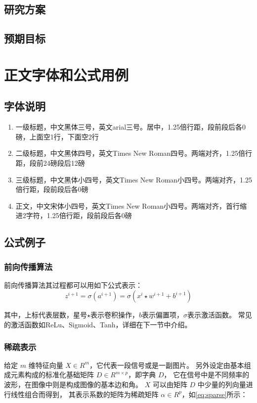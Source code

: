 \documentclass[12pt]{zjutbook}
\begin{document}
\section{研究方案}
\section{预期目标}

\chapter{正文字体和公式用例}
\section{字体说明}
\begin{enumerate}
  \item 一级标题，中文黑体三号，英文arial三号。居中，1.25倍行距，段前段后各0磅，上面空1行，下面空2行
  \item 二级标题，中文黑体四号，英文Times New Roman四号。两端对齐，1.25倍行距，段前24磅段后12磅
  \item 三级标题，中文黑体小四号，英文Times New Roman小四号。两端对齐，1.25倍行距，段前段后各0磅
  \item 正文，中文宋体小四号，英文Times New Roman小四号。两端对齐，首行缩进2字符，1.25倍行距，段前段后各0磅
\end{enumerate}

\section{公式例子}
\subsection{前向传播算法}
前向传播算法其过程都可以用如下公式表示：
\begin{equation}
  z^{i+1}=\sigma(a^{i+1})=\sigma(x^i\star w^{i+1}+b^{i+1})
\end{equation}

其中，上标代表层数，星号$\star$表示卷积操作，$b$表示偏置项，$\sigma$表示激活函数。
常见的激活函数如ReLu、Sigmoid、Tanh，详细在下一节中介绍。

\subsection{稀疏表示}
给定 $m$ 维特征向量 $X\in R^m$，它代表一段信号或是一副图片。
另外设定由基本组成元素构成的标准化基础矩阵 $D\in R^{m\times p}$，即字典 $D$，
它在信号中是不同频率的波形，在图像中则是构成图像的基本边和角。
$X$ 可以由矩阵 $D$ 中少量的列向量进行线性组合而得到，
其表示系数的矩阵为稀疏矩阵 $\alpha\in R^p$，如\autoref{eq:sparse}所示：
\end{document}

